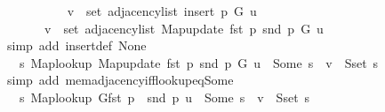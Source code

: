 \begin{isabellebody}
\ \ \ \ \isamarkupfalse%
\isanewline
\ \ \ \ \ \ {\isachardoublequoteopen}v\ {\isasymin}\ set\ {\isacharparenleft}{\kern0pt}adjacency{\isacharunderscore}{\kern0pt}list\ {\isacharparenleft}{\kern0pt}insert{\isacharunderscore}{\kern0pt}{}\ p\ G{\isacharparenright}{\kern0pt}\ u{\isacharparenright}{\kern0pt}\ {\isasymlongleftrightarrow}\isanewline
\ \ \ \ \ \ \ v\ {\isasymin}\ set\ {\isacharparenleft}{\kern0pt}adjacency{\isacharunderscore}{\kern0pt}list\ {\isacharparenleft}{\kern0pt}Map{\isacharunderscore}{\kern0pt}update\ {\isacharparenleft}{\kern0pt}fst\ p{\isacharparenright}{\kern0pt}\ {\isacharparenleft}{\kern0pt}snd\ p{\isacharparenright}{\kern0pt}\ G{\isacharparenright}{\kern0pt}\ u{\isacharparenright}{\kern0pt}{\isachardoublequoteclose}\isanewline
\ \ \ \ \ \ \isamarkupfalse%
\ {\isacharparenleft}{\kern0pt}simp\ add{\isacharcolon}{\kern0pt}\ insert{\isacharunderscore}{\kern0pt}{}{\isacharunderscore}{\kern0pt}def\ None{\isacharparenright}{\kern0pt}\isanewline
\ \ \ \ \isamarkupfalse%
\ \isamarkupfalse%
\ {\isachardoublequoteopen}{\isachardot}{\kern0pt}{\isachardot}{\kern0pt}{\isachardot}{\kern0pt}\ {\isasymlongleftrightarrow}\ {\isacharparenleft}{\kern0pt}{\isasymexists}s{\isachardot}{\kern0pt}\ Map{\isacharunderscore}{\kern0pt}lookup\ {\isacharparenleft}{\kern0pt}Map{\isacharunderscore}{\kern0pt}update\ {\isacharparenleft}{\kern0pt}fst\ p{\isacharparenright}{\kern0pt}\ {\isacharparenleft}{\kern0pt}snd\ p{\isacharparenright}{\kern0pt}\ G{\isacharparenright}{\kern0pt}\ u\ {\isacharequal}{\kern0pt}\ Some\ s\ {\isasymand}\ v\ {\isasymin}\ S{\isachardot}{\kern0pt}set\ s{\isacharparenright}{\kern0pt}{\isachardoublequoteclose}\isanewline
\ \ \ \ \ \ \isamarkupfalse%
\ {\isacharparenleft}{\kern0pt}simp\ add{\isacharcolon}{\kern0pt}\ mem{\isacharunderscore}{\kern0pt}adjacency{\isacharunderscore}{\kern0pt}iff{\isacharunderscore}{\kern0pt}lookup{\isacharunderscore}{\kern0pt}eq{\isacharunderscore}{\kern0pt}Some{\isacharparenright}{\kern0pt}\isanewline
\ \ \ \ \isamarkupfalse%
\ \isamarkupfalse%
\ {\isachardoublequoteopen}{\isachardot}{\kern0pt}{\isachardot}{\kern0pt}{\isachardot}{\kern0pt}\ {\isasymlongleftrightarrow}\ {\isacharparenleft}{\kern0pt}{\isasymexists}s{\isachardot}{\kern0pt}\ {\isacharparenleft}{\kern0pt}Map{\isacharunderscore}{\kern0pt}lookup\ G{\isacharparenleft}{\kern0pt}fst\ p\ {\isasymmapsto}\ snd\ p{\isacharparenright}{\kern0pt}{\isacharparenright}{\kern0pt}\ u\ {\isacharequal}{\kern0pt}\ Some\ s\ {\isasymand}\ v\ {\isasymin}\ S{\isachardot}{\kern0pt}set\ s{\isacharparenright}{\kern0pt}{\isachardoublequoteclose}\isanewline

\end{isabellebody}
